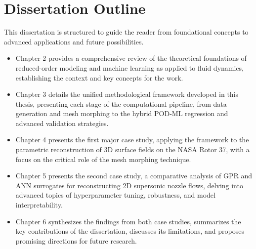 \section{Dissertation Outline}

This dissertation is structured to guide the reader from foundational concepts to advanced applications and future possibilities.

\begin{itemize}
    \item Chapter 2 provides a comprehensive review of the theoretical foundations of reduced-order modeling and machine learning as applied to fluid dynamics, establishing the context and key concepts for the work.
    
    \item Chapter 3 details the unified methodological framework developed in this thesis, presenting each stage of the computational pipeline, from data generation and mesh morphing to the hybrid POD-ML regression and advanced validation strategies.
    
    \item Chapter 4 presents the first major case study, applying the framework to the parametric reconstruction of 3D surface fields on the NASA Rotor 37, with a focus on the critical role of the mesh morphing technique.
    
    \item Chapter 5 presents the second case study, a comparative analysis of GPR and ANN surrogates for reconstructing 2D supersonic nozzle flows, delving into advanced topics of hyperparameter tuning, robustness, and model interpretability.
    
    \item Chapter 6 synthesizes the findings from both case studies, summarizes the key contributions of the dissertation, discusses its limitations, and proposes promising directions for future research.
\end{itemize}